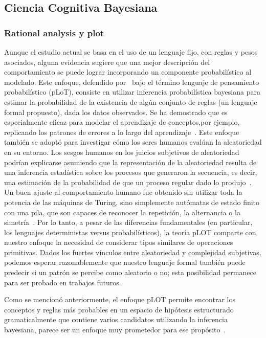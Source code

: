 \subsection{Ciencia Cognitiva Bayesiana}
\label{INTRO:BAYES}
\subsubsection{Rational analysis y plot}

Aunque el estudio actual se basa en el uso de un lenguaje fijo, con reglas y pesos asociados, alguna evidencia sugiere que una mejor descripción del comportamiento se puede lograr incorporando un componente probabilístico al modelado. Este enfoque, defendido por~\cite{piantadosi2016four} bajo el término lenguaje de pensamiento probabilístico (pLoT), consiste en utilizar inferencia probabilística bayesiana para estimar la probabilidad de la existencia de algún conjunto de reglas (un lenguaje formal propuesto), dada los datos observados. Se ha demostrado que es especialmente eficaz para modelar el aprendizaje de conceptos,por ejemplo, replicando los patrones de errores a lo largo del aprendizaje~\cite{goodman2008rational,piantadosi2012bootstrapping,piantadosi2016logical}. Este enfoque también se adoptó para investigar cómo los seres humanos evalúan la aleatoriedad en su entorno. Los sesgos humanos en los juicios subjetivos de aleatoriedad~\cite{f114,f115} podrían explicarse asumiendo que la representación de la aleatoriedad resulta de una inferencia estadística sobre los procesos que generaron la secuencia, es decir, una estimación de la probabilidad de que un proceso regular dado lo produjo~\cite{f21}. Un buen ajuste al comportamiento humano fue obtenido sin utilizar toda la potencia de las máquinas de Turing, sino simplemente autómatas de estado finito con una pila, que son capaces de reconocer la repetición, la alternancia o la simetría~\cite{f18,f117}. Por lo tanto, a pesar de las diferencias fundamentales (en particular, los lenguajes deterministas versus probabilísticos), la teoría pLOT comparte con nuestro enfoque la necesidad de considerar tipos similares de operaciones primitivas. Dados los fuertes vínculos entre aleatoriedad y complejidad subjetivas, podemos esperar razonablemente que nuestro lenguaje formal también puede predecir si un patrón se percibe como aleatorio o no; esta posibilidad permanece para ser probado en trabajos futuros.

Como se mencionó anteriormente, el enfoque pLOT permite encontrar los conceptos y reglas más probables en un espacio de hipótesis estructurado gramaticalmente que contiene varios candidatos utilizando la inferencia bayesiana, parece ser un enfoque muy prometedor para ese propósito~\cite{goodman2008rational,piantadosi2016four,romano2018bayesian}. 
